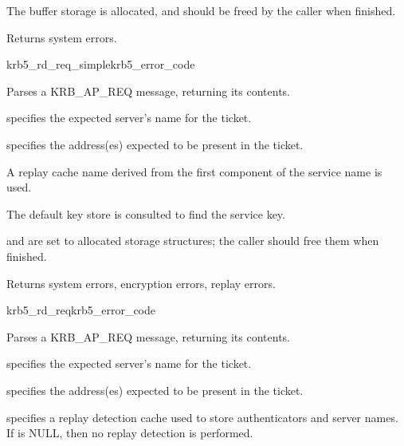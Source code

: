 The  buffer storage is allocated, and should be freed
by the caller when finished.

Returns system errors.


\begin{funcdecl}{krb5_rd_req_simple}{krb5_error_code}{\funcin}
\funcout
{}
\end{funcdecl}

Parses a KRB_AP_REQ message, returning its contents.

 specifies the expected server's name for the ticket.

 specifies the address(es) expected to be present
in the ticket.

A replay cache name derived from the first component of the service name
is used.

The default key store is consulted to find the service key.

 and
 are set to allocated storage
structures; the caller should free them when finished.

Returns system errors, encryption errors, replay errors.


\begin{funcdecl}{krb5_rd_req}{krb5_error_code}{\funcin}
\funcendfuncarg
{}
\funcinout
{}
\funcout
{}
\end{funcdecl}


Parses a KRB_AP_REQ message, returning its contents.

 specifies the expected server's name for the ticket.

 specifies the address(es) expected to be present
in the ticket.

 specifies a replay detection cache used to store
authenticators and server names.  If  is NULL, then no
replay detection is performed.

